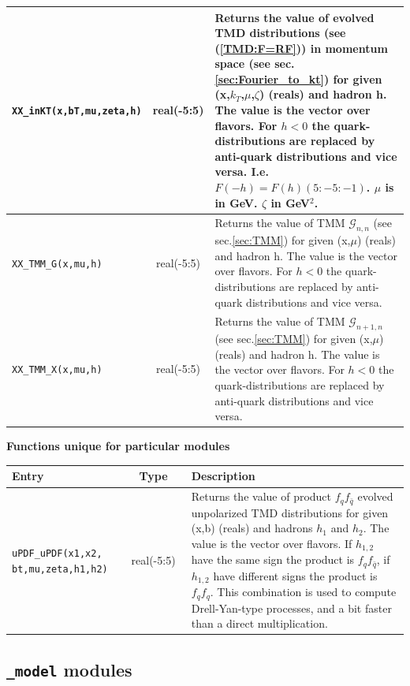 \documentclass[prd,nofootinbib,eqsecnum,final]{revtex4}
\renewcommand{\(}{\left(}
\renewcommand{\)}{\right)}
\renewcommand{\[}{\left[}
\renewcommand{\]}{\right]}
\newcommand{\blue}[1]{{\color{blue} #1}}
\begin{document}
\begin{center}
\begin{tabular}{||p{5.5cm}||c||p{8.5cm}||}
\texttt{XX\_inKT(x,bT,mu,zeta,h)} & real(-5:5) & Returns the value of \blue{evolved} TMD distributions (see (\ref{TMD:F=RF})) \blue{in momentum space} (see sec.\ref{sec:Fourier_to_kt}) for given (x,$k_T$,$\mu$,$\zeta$) (reals) and hadron h. The value is the vector over flavors. For $h<0$ the quark-distributions are replaced by anti-quark distributions and vice versa. I.e. $F(-h)=F(h)(5:-5:-1)$. $\mu$ is in GeV. $\zeta$ in GeV$^2$.
\\\hline
\texttt{XX\_TMM\_G(x,mu,h)} & real(-5:5) & Returns the value of TMM $\mathcal{G}_{n,n}$ (see sec.\ref{sec:TMM}) for given (x,$\mu$) (reals) and hadron h. The value is the vector over flavors. For $h<0$ the quark-distributions are replaced by anti-quark distributions and vice versa.
\\\hline
\texttt{XX\_TMM\_X(x,mu,h)} & real(-5:5) & Returns the value of TMM $\mathcal{G}_{n+1,n}$ (see sec.\ref{sec:TMM}) for given (x,$\mu$) (reals) and hadron h. The value is the vector over flavors. For $h<0$ the quark-distributions are replaced by anti-quark distributions and vice versa.
\\\hline\hline
\end{tabular}
\end{center}

\begin{center}
\textbf{Functions unique for particular modules}
\\
\begin{tabular}{||p{5.5cm}||c||p{8.5cm}||}
\hline\hline
Entry &~~Type~~& Description
\\\hline
\texttt{uPDF\_uPDF(x1,x2,} \texttt{bt,mu,zeta,h1,h2)} & real(-5:5) & Returns the value of product $f_q f_{\bar q}$ evolved unpolarized TMD distributions for given (x,b) (reals) and hadrons $h_1$ and $h_2$. The value is the vector over flavors. If $h_{1,2}$ have the same sign the product is $f_q f_{\bar q}$, if $h_{1,2}$ have different signs the product is $f_q f_{q}$. This combination is used to compute Drell-Yan-type processes, and a bit faster than a direct multiplication.
\\\hline\hline
\end{tabular}
\end{center}

\newpage
\subsection{\texttt{\_model} modules}
\end{document}
